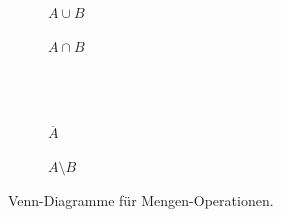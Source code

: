 \documentclass[11pt, a4paper]{article}
\theoremstyle{definition}
\theoremstyle{plain}
\numberwithin{equation}{section}
\newcommand{\comp}[1]{\overline{#1}}
\begin{document}
\begin{figure}
	\centering
	\begin{subfigure}[b]{.49\textwidth}
		\centering
		
		\caption{\( A \cup B \)}
		\label{fig:venn_union}
	\end{subfigure}
	\begin{subfigure}[b]{.49\textwidth}
		\centering
		
		\caption{\( A \cap B \)}
		\label{fig:venn_intersection}
	\end{subfigure}\\
	\ \\
	\begin{subfigure}[b]{.49\textwidth}
		\centering
		
		\caption{\( \comp{A} \)}
		\label{fig:venn_complement}
	\end{subfigure}
	\begin{subfigure}[b]{.49\textwidth}
		\centering
		
		\caption{\( A \setminus B \)}
		\label{fig:venn_setminus}
	\end{subfigure}
	\caption{Venn-Diagramme für Mengen-Operationen.}
	\label{fig:venn}
\end{figure}
\end{document}
